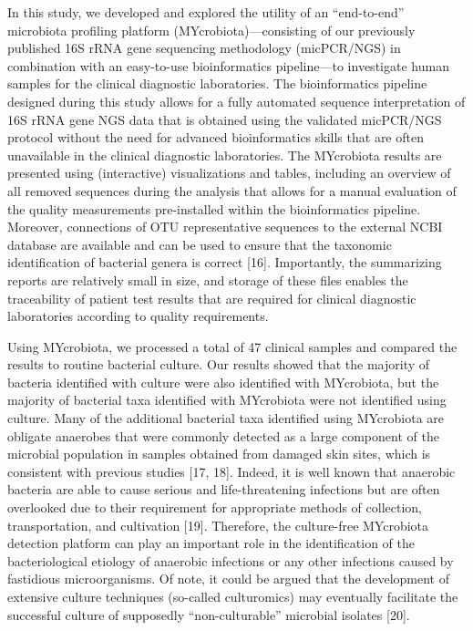 In this study, we developed and explored the utility of an “end-to-end” microbiota profiling platform (MYcrobiota)—consisting of our
previously published 16S rRNA gene sequencing methodology (micPCR/NGS) in combination with an easy-to-use bioinformatics pipeline—to
investigate human samples for the clinical diagnostic laboratories. The bioinformatics pipeline designed during this study allows for
a fully automated sequence interpretation of 16S rRNA gene NGS data that is obtained using the validated micPCR/NGS protocol without
the need for advanced bioinformatics skills that are often unavailable in the clinical diagnostic laboratories. The MYcrobiota results
are presented using (interactive) visualizations and tables, including an overview of all removed sequences during the analysis that
allows for a manual evaluation of the quality measurements pre-installed within the bioinformatics pipeline. Moreover, connections of
OTU representative sequences to the external NCBI database are available and can be used to ensure that the taxonomic identification
of bacterial genera is correct [16]. Importantly, the summarizing reports are relatively small in size, and storage of these files
enables the traceability of patient test results that are required for clinical diagnostic laboratories according to quality requirements.

Using MYcrobiota, we processed a total of 47 clinical samples and compared the results to routine bacterial culture. Our results showed
that the majority of bacteria identified with culture were also identified with MYcrobiota, but the majority of bacterial taxa identified
with MYcrobiota were not identified using culture. Many of the additional bacterial taxa identified using MYcrobiota are obligate anaerobes
that were commonly detected as a large component of the microbial population in samples obtained from damaged skin sites, which is consistent
with previous studies [17, 18]. Indeed, it is well known that anaerobic bacteria are able to cause serious and life-threatening infections
but are often overlooked due to their requirement for appropriate methods of collection, transportation, and cultivation [19]. Therefore,
the culture-free MYcrobiota detection platform can play an important role in the identification of the bacteriological etiology of anaerobic
infections or any other infections caused by fastidious microorganisms. Of note, it could be argued that the development of extensive culture
techniques (so-called culturomics) may eventually facilitate the successful culture of supposedly “non-culturable” microbial isolates [20].


